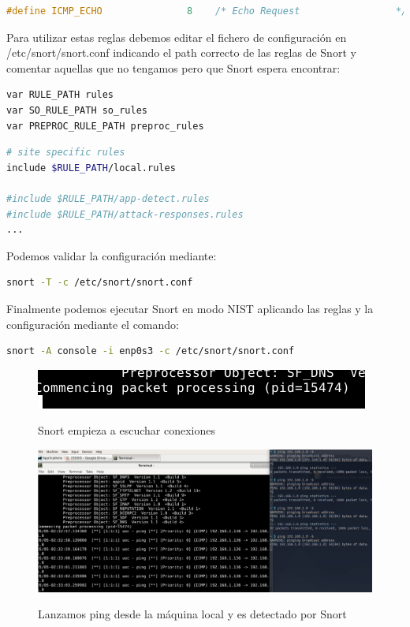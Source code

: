 \documentclass[10pt,a4paper]{article}
\begin{document}
\begin{enumerate}[label=\textbf{\alph*)}]
\begin{lstlisting}[language=c, caption={Extracto de src/decode.h de Snort donde se incluyen los distintos tipos de ICMP}]
#define ICMP_ECHO               8    /* Echo Request                 */
\end{lstlisting}

Para utilizar estas reglas debemos editar el fichero de configuración en /etc/snort/snort.conf indicando el path correcto de las reglas de Snort y comentar aquellas que no tengamos pero que Snort espera encontrar:
\begin{lstlisting}[language=bash, caption={Los path de los rules quedan ahora bajo /etc/snort/}]
var RULE_PATH rules
var SO_RULE_PATH so_rules
var PREPROC_RULE_PATH preproc_rules
\end{lstlisting}

\begin{lstlisting}[language=bash, caption={Quedan deshabilitadas las reglas a excepción de local.rules}]
# site specific rules
include $RULE_PATH/local.rules

#include $RULE_PATH/app-detect.rules
#include $RULE_PATH/attack-responses.rules
...
\end{lstlisting}

Podemos validar la configuración mediante:
\begin{lstlisting}[language=bash]
snort -T -c /etc/snort/snort.conf
\end{lstlisting}

Finalmente podemos ejecutar Snort en modo NIST aplicando las reglas y la configuración mediante el comando:
\begin{lstlisting}[language=bash]
snort -A console -i enp0s3 -c /etc/snort/snort.conf
\end{lstlisting}

\begin{figure}[h!]
  \centering
  \includegraphics[scale=0.6]{snort2.png}\\
  \caption{Snort empieza a escuchar conexiones}
  \label{fig:snort2}
\end{figure}

\begin{figure}[h!]
  \centering
  \includegraphics[scale=0.3]{snort3.png}\\
  \caption{Lanzamos ping desde la máquina local y es detectado por Snort}
  \label{fig:snort2}
\end{figure}


\end{enumerate}
\end{document}
